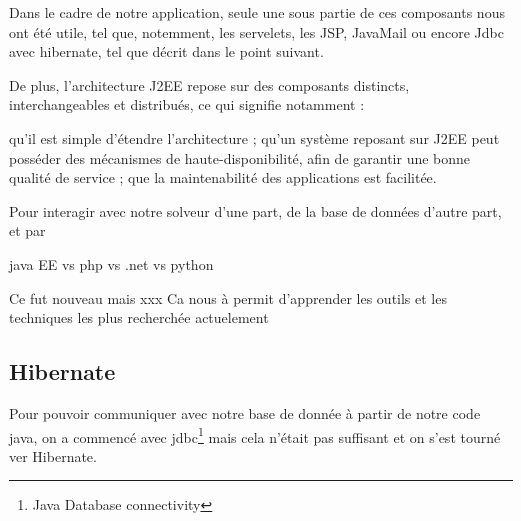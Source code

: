 Dans le cadre de notre application, seule une sous partie de ces composants nous ont été utile, tel que, notemment, les servelets, les JSP, JavaMail ou encore Jdbc avec hibernate, tel que décrit dans le point suivant.

De plus, l'architecture J2EE repose sur des composants distincts, interchangeables et distribués, ce qui signifie notamment :

qu'il est simple d'étendre l'architecture ;
qu'un système reposant sur J2EE peut posséder des mécanismes de haute-disponibilité, afin de garantir une bonne qualité de service ;
que la maintenabilité des applications est facilitée.

Pour interagir avec notre solveur d'une part, de la base de données d'autre part, et par


java EE vs php vs .net vs python

Ce fut nouveau mais xxx
Ca nous à permit d'apprender les outils et les techniques les plus recherchée actuelement 

\subsection{Hibernate}

Pour pouvoir communiquer avec notre base de donnée à partir de notre code java, on a commencé avec jdbc\footnote{Java Database connectivity} mais cela n'était pas suffisant et on s'est tourné ver Hibernate.

